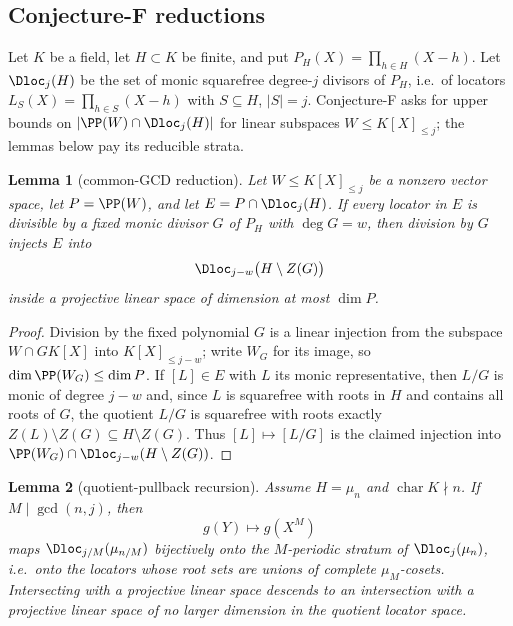 \documentclass[11pt]{article}
\newtheorem{lemma}[lemma]{Lemma}
\theoremstyle{definition}
\theoremstyle{remark}
\begin{document}
\subsection{Conjecture-F reductions}

Let $K$ be a field, let $H\subset K$ be finite, and put $P_H(X)=\prod_{h\in H}(X-h)$.  Let $\Dloc_j(H)$ be the set of monic squarefree degree-$j$ divisors of $P_H$, i.e.\ of locators $L_S(X)=\prod_{h\in S}(X-h)$ with $S\subseteq H$, $|S|=j$.  Conjecture-F asks for upper bounds on $|\PP(W)\cap\Dloc_j(H)|$ for linear subspaces $W\le K[X]_{\le j}$; the lemmas below pay its reducible strata.

\begin{lemma}[common-GCD reduction]\label{lem:capf-gcd}
Let $W\le K[X]_{\le j}$ be a nonzero vector space, let $P=\PP(W)$, and let $E=P\cap\Dloc_j(H)$.  If every locator in $E$ is divisible by a fixed monic divisor $G$ of $P_H$ with $\deg G=w$, then division by $G$ injects $E$ into
\[
        \Dloc_{j-w}\bigl(H\setminus Z(G)\bigr)
\]
inside a projective linear space of dimension at most $\dim P$.
\end{lemma}

\begin{proof}
Division by the fixed polynomial $G$ is a linear injection from the subspace $W\cap GK[X]$ into $K[X]_{\le j-w}$; write $W_G$ for its image, so $\dim\PP(W_G)\le\dim P$.  If $[L]\in E$ with $L$ its monic representative, then $L/G$ is monic of degree $j-w$ and, since $L$ is squarefree with roots in $H$ and contains all roots of $G$, the quotient $L/G$ is squarefree with roots exactly $Z(L)\setminus Z(G)\subseteq H\setminus Z(G)$.  Thus $[L]\mapsto[L/G]$ is the claimed injection into $\PP(W_G)\cap\Dloc_{j-w}(H\setminus Z(G))$.
\end{proof}

\begin{lemma}[quotient-pullback recursion]\label{lem:capf-quot-pullback}
Assume $H=\mu_n$ and $\operatorname{char}K\nmid n$.  If $M\mid\gcd(n,j)$, then
\[
        g(Y)\longmapsto g(X^M)
\]
maps $\Dloc_{j/M}(\mu_{n/M})$ bijectively onto the $M$-periodic stratum of $\Dloc_j(\mu_n)$, i.e.\ onto the locators whose root sets are unions of complete $\mu_M$-cosets.  Intersecting with a projective linear space descends to an intersection with a projective linear space of no larger dimension in the quotient locator space.
\end{lemma}
\end{document}
